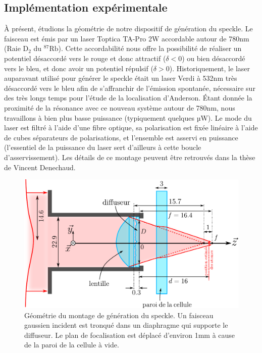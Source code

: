 \subsection{Implémentation expérimentale}
À présent, étudions la géométrie de notre dispositif de génération du speckle. Le faisceau est émis par un laser Toptica TA-Pro 2W accordable autour de 780nm (Raie $\mathrm{D}_2$ du ${}^{87}\text{Rb}$). Cette accordabilité nous offre la possibilité de réaliser un potentiel désaccordé vers le rouge et donc attractif ($\delta < 0$) ou bien désaccordé vers le bleu, et donc avoir un potentiel répulsif ($\delta > 0$). Historiquement, le laser auparavant utilisé pour générer le speckle était un laser Verdi à 532nm très désaccordé vers le bleu afin de s'affranchir de l'émission spontanée, nécessaire sur des très longs temps pour l'étude de la localisation d'Anderson. Étant donnée la proximité de la résonance avec ce nouveau système autour de 780nm, nous travaillons à bien plus basse puissance (typiquement quelques µW). Le mode du laser est filtré à l'aide d'une fibre optique, sa polarisation est fixée linéaire à l'aide de cubes séparateurs de polarisations, et l'ensemble est asservi en puissance (l'essentiel de la puissance du laser sert d'ailleurs à cette boucle d'asservissement). Les détails de ce montage peuvent être retrouvés dans la thèse de Vincent Denechaud. 

\begin{figure}
\centering
\includegraphics[scale=0.7]{Fig/Speckle/montage_diffuseur.pdf}
\caption{Géométrie du montage de génération du speckle. Un faisceau gaussien incident est tronqué dans un diaphragme qui supporte le diffuseur. Le plan de focalisation est déplacé d'environ 1mm à cause de la paroi de la cellule à vide.}
\label{fig:montage_diffuseur}
\end{figure}

